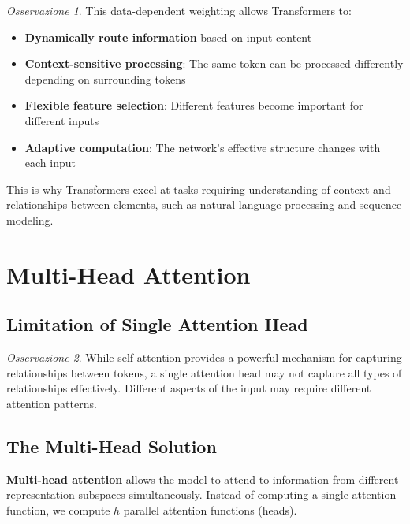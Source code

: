 \documentclass[11pt,a4paper]{article}
\theoremstyle{definition}
\theoremstyle{plain}
\theoremstyle{remark}
\newtheorem*{observation}{Osservazione}
\begin{document}
\begin{observation}
This data-dependent weighting allows Transformers to:
\begin{itemize}
    \item \textbf{Dynamically route information} based on input content
    \item \textbf{Context-sensitive processing}: The same token can be processed differently depending on surrounding tokens
    \item \textbf{Flexible feature selection}: Different features become important for different inputs
    \item \textbf{Adaptive computation}: The network's effective structure changes with each input
\end{itemize}

This is why Transformers excel at tasks requiring understanding of context and relationships between elements, such as natural language processing and sequence modeling.
\end{observation}

\section{Multi-Head Attention}

\subsection{Limitation of Single Attention Head}

\begin{observation}
While self-attention provides a powerful mechanism for capturing relationships between tokens, a single attention head may not capture all types of relationships effectively. Different aspects of the input may require different attention patterns.
\end{observation}

\subsection{The Multi-Head Solution}

\begin{tcolorbox}[colback=green!10!white,colframe=green!75!black,title=\textbf{Multi-Head Attention}]
\textbf{Multi-head attention} allows the model to attend to information from different representation subspaces simultaneously. Instead of computing a single attention function, we compute $h$ parallel attention functions (heads).
\end{tcolorbox}
\end{document}
